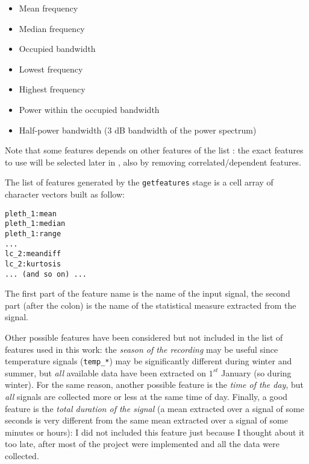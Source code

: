 \noindent\underline{}
\begin{multicols}{2}
\begin{itemize}
\item Mean frequency
\item Median frequency
\item Occupied bandwidth
\item Lowest frequency
\item Highest frequency
\item Power within the occupied bandwidth
\item Half-power bandwidth (3 dB bandwidth of the power spectrum)
\end{itemize}
\end{multicols}

Note that some features depends on other features of the list : the exact features to use will be selected
later in , also by removing correlated/dependent
features.

The list of features generated by the \texttt{getfeatures} stage is a cell
array of character vectors built as follow:
\begin{verbatim}
pleth_1:mean
pleth_1:median
pleth_1:range
...
lc_2:meandiff
lc_2:kurtosis
... (and so on) ...
\end{verbatim}
The first part of the feature name is the name of the input signal, the second
part (after the colon) is the name of the statistical measure extracted from
the signal.

Other possible features have been considered but not included in the list of
features used in this work: the \emph{season of the recording} may be useful
since temperature signals (\texttt{temp\_*}) may be significantly different
during winter and summer, but \emph{all} available data have been extracted on
\(1^{st}\) January (so during winter). For the same reason, another possible
feature is the \emph{time of the day}, but \emph{all} signals are collected
more or less at the same time of day. Finally, a good feature is the
\emph{total duration of the signal} (a mean extracted over a signal of some
seconds is very different from the same mean extracted over a signal of some
minutes or hours): I did not included this feature just because I thought about
it too late, after most of the project were implemented and all the data were
collected.

